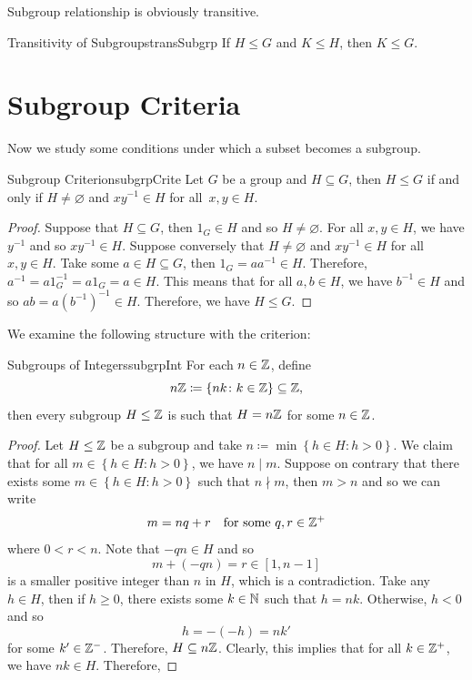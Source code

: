\documentclass[math]{amznotes}
\theoremstyle{remark}
\newcommand{\0}{\mathbf{0}}
\newcommand{\1}{\mathbf{1}}
\begin{document}
Subgroup relationship is obviously transitive.
\begin{probox}{Transitivity of Subgroups}{transSubgrp}
    If $H \leq G$ and $K \leq H$, then $K \leq G$.
\end{probox}
\section{Subgroup Criteria}
Now we study some conditions under which a subset becomes a subgroup.
\begin{probox}{Subgroup Criterion}{subgrpCrite}
    Let $G$ be a group and $H \subseteq G$, then $H \leq G$ if and only if $H \neq \varnothing$ and $xy^{-1} \in H$ for all~$x, y \in H$.
    \tcblower
    \begin{proof}
        Suppose that $H \subseteq G$, then $1_G \in H$ and so $H \neq \varnothing$. For all $x, y \in H$, we have $y^{-1}$ and so $xy^{-1} \in H$. Suppose conversely that $H \neq \varnothing$ and $xy^{-1} \in H$ for all $x, y \in H$. Take some $a \in H \subseteq G$, then $1_G = aa^{-1} \in H$. Therefore, $a^{-1} = a1_G^{-1} = a1_G = a \in H$. This means that for all $a, b \in H$, we have $b^{-1} \in H$ and so $ab = a\left(b^{-1}\right)^{-1} \in H$. Therefore, we have $H \leq G$.
    \end{proof}
\end{probox}
We examine the following structure with the criterion:
\begin{probox}{Subgroups of Integers}{subgrpInt}
    For each $n \in \mathbb{Z}$, define 
    \begin{equation*}
        n\mathbb{Z} \coloneqq \left\{nk \colon k \in \mathbb{Z}\right\} \subseteq \mathbb{Z},
    \end{equation*}
    then every subgroup $H \leq \mathbb{Z}$ is such that $H = n\mathbb{Z}$ for some $n \in \mathbb{Z}$.
    \tcblower
    \begin{proof}
        Let $H \leq \mathbb{Z}$ be a subgroup and take $n \coloneqq \min\left\{h \in H \colon h > 0\right\}$. We claim that for all $m \in \left\{h \in H \colon h > 0\right\}$, we have $n \mid m$. Suppose on contrary that there exists some $m \in \left\{h \in H \colon h > 0\right\}$ such that $n \nmid m$, then $m > n$ and so we can write
        \begin{equation*}
            m = nq + r \quad\textrm{for some } q, r \in \mathbb{Z}^+
        \end{equation*}
        where $0 < r < n$. Note that $-qn \in H$ and so 
        \begin{equation*}
            m + \left(-qn\right) = r \in \left[1, n - 1\right]
        \end{equation*}
        is a smaller positive integer than $n$ in $H$, which is a contradiction. Take any $h \in H$, then if $h \geq 0$, there exists some $k \in \mathbb{N}$ such that $h = nk$. Otherwise, $h < 0$ and so 
        \begin{equation*}
            h = -\left(-h\right) = nk'
        \end{equation*}
        for some $k' \in \mathbb{Z}^-$. Therefore, $H \subseteq n\mathbb{Z}$. Clearly, this implies that for all $k \in \mathbb{Z}^+$, we have $nk \in H$. Therefore, 
    \end{proof}
\end{probox}
\end{document}
